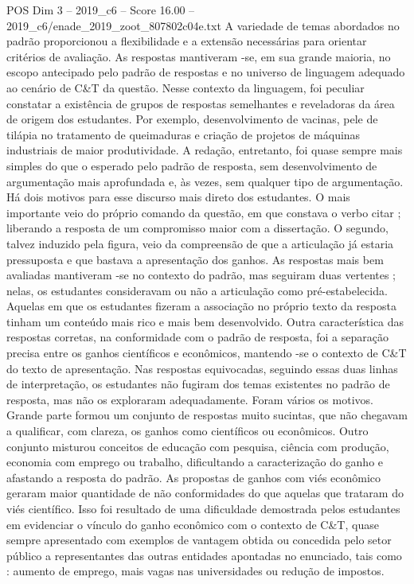 \begin{textsample}{POS Dim 3 – 2019\_c6 – Score 16.00 – 2019\_c6/enade\_2019\_zoot\_807802c04e.txt}
A variedade de temas abordados no padrão proporcionou a flexibilidade e a extensão necessárias para orientar critérios de avaliação.
As respostas mantiveram -se, em sua grande maioria, no escopo antecipado pelo padrão de respostas e no universo de linguagem adequado ao cenário de C\&T da questão.
Nesse contexto da linguagem, foi peculiar constatar a existência de grupos de respostas semelhantes e reveladoras da área de origem dos estudantes.
Por exemplo, desenvolvimento de vacinas, pele de tilápia no tratamento de queimaduras e criação de projetos de máquinas industriais de maior produtividade.
A redação, entretanto, foi quase sempre mais simples do que o esperado pelo padrão de resposta, sem desenvolvimento de argumentação mais aprofundada e, às vezes, sem qualquer tipo de argumentação.
Há dois motivos para esse discurso mais direto dos estudantes.
O mais importante veio do próprio comando da questão, em que constava o verbo citar ; liberando a resposta de um compromisso maior com a dissertação.
O segundo, talvez induzido pela figura, veio da compreensão de que a articulação já estaria pressuposta e que bastava a apresentação dos ganhos.
As respostas mais bem avaliadas mantiveram -se no contexto do padrão, mas seguiram duas vertentes ; nelas, os estudantes consideravam ou não a articulação como pré-estabelecida.
Aquelas em que os estudantes fizeram a associação no próprio texto da resposta tinham um conteúdo mais rico e mais bem desenvolvido.
Outra característica das respostas corretas, na conformidade com o padrão de resposta, foi a separação precisa entre os ganhos científicos e econômicos, mantendo -se o contexto de C\&T do texto de apresentação.
Nas respostas equivocadas, seguindo essas duas linhas de interpretação, os estudantes não fugiram dos temas existentes no padrão de resposta, mas não os exploraram adequadamente.
Foram vários os motivos.
Grande parte formou um conjunto de respostas muito sucintas, que não chegavam a qualificar, com clareza, os ganhos como científicos ou econômicos.
Outro conjunto misturou conceitos de educação com pesquisa, ciência com produção, economia com emprego ou trabalho, dificultando a caracterização do ganho e afastando a resposta do padrão.
As propostas de ganhos com viés econômico geraram maior quantidade de não conformidades do que aquelas que trataram do viés científico.
Isso foi resultado de uma dificuldade demostrada pelos estudantes em evidenciar o vínculo do ganho econômico com o contexto de C\&T, quase sempre apresentado com exemplos de vantagem obtida ou concedida pelo setor público a representantes das outras entidades apontadas no enunciado, tais como : aumento de emprego, mais vagas nas universidades ou redução de impostos.

\end{textsample}
